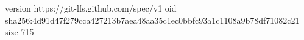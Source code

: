 version https://git-lfs.github.com/spec/v1
oid sha256:4d91d47f279cca427213b7aea48aa35c1ec0bbfc93a1c1108a9b78df71082c21
size 715
